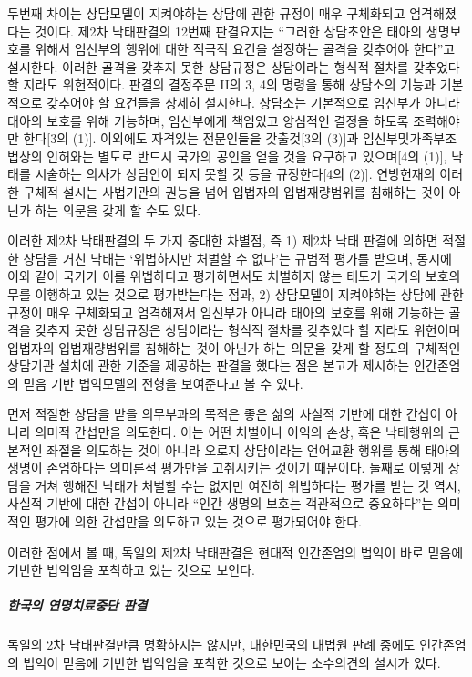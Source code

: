 두번째 차이는 상담모델이 지켜야하는 상담에 관한 규정이 매우 구체화되고 엄격해졌다는 것이다. 제2차 낙태판결의 12번째 판결요지는 ``그러한 상담초안은 태아의 생명보호를 위해서 임신부의 행위에 대한 적극적 요건을 설정하는 골격을 갖추어야 한다''고 설시한다. 이러한 골격을 갖추지 못한 상담규정은 상담이라는 형식적 절차를 갖추었다 할 지라도 위헌적이다. 판결의 결정주문 II의 3, 4의 명령을 통해 상담소의 기능과 기본적으로 갖추어야 할 요건들을 상세히 설시한다. 상담소는 기본적으로 임신부가 아니라 태아의 보호를 위해 기능하며, 임신부에게 책임있고 양심적인 결정을 하도록 조력해야만 한다{[}3의 (1){]}. 이외에도 자격있는 전문인들을 갖출것{[}3의 (3){]}과 임신부및가족부조법상의 인허와는 별도로 반드시 국가의 공인을 얻을 것을 요구하고 있으며{[}4의 (1){]}, 낙태를 시술하는 의사가 상담인이 되지 못할 것 등을 규정한다{[}4의 (2){]}. 연방헌재의 이러한 구체적 설시는 사법기관의 권능을 넘어 입법자의 입법재량범위를 침해하는 것이 아닌가 하는 의문을 갖게 할 수도 있다.

이러한 제2차 낙태판결의 두 가지 중대한 차별점, 즉 1) 제2차 낙태 판결에 의하면 적절한 상담을 거친 낙태는 `위법하지만 처벌할 수 없다'는 규범적 평가를 받으며, 동시에 이와 같이 국가가 이를 위법하다고 평가하면서도 처벌하지 않는 태도가 국가의 보호의무를 이행하고 있는 것으로 평가받는다는 점과, 2) 상담모델이 지켜야하는 상담에 관한 규정이 매우 구체화되고 엄격해져서 임신부가 아니라 태아의 보호를 위해 기능하는 골격을 갖추지 못한 상담규정은 상담이라는 형식적 절차를 갖추었다 할 지라도 위헌이며 입법자의 입법재량범위를 침해하는 것이 아닌가 하는 의문을 갖게 할 정도의 구체적인 상담기관 설치에 관한 기준을 제공하는 판결을 했다는 점은 본고가 제시하는 인간존엄의 믿음 기반 법익모델의 전형을 보여준다고 볼 수 있다.

먼저 적절한 상담을 받을 의무부과의 목적은 좋은 삶의 사실적 기반에 대한 간섭이 아니라 의미적 간섭만을 의도한다. 이는 어떤 처벌이나 이익의 손상, 혹은 낙태행위의 근본적인 좌절을 의도하는 것이 아니라 오로지 상담이라는 언어교환 행위를 통해 태아의 생명이 존엄하다는 의미론적 평가만을 고취시키는 것이기 때문이다. 둘째로 이렇게 상담을 거쳐 행해진 낙태가 처벌할 수는 없지만 여전히 위법하다는 평가를 받는 것 역시, 사실적 기반에 대한 간섭이 아니라 ``인간 생명의 보호는 객관적으로 중요하다''는 의미적인 평가에 의한 간섭만을 의도하고 있는 것으로 평가되어야 한다.

이러한 점에서 볼 때, 독일의 제2차 낙태판결은 현대적 인간존엄의 법익이 바로 믿음에 기반한 법익임을 포착하고 있는 것으로 보인다.

\subparagraph{한국의 연명치료중단 판결}

독일의 2차 낙태판결만큼 명확하지는 않지만, 대한민국의 대법원 판례 중에도 인간존엄의 법익이 믿음에 기반한 법익임을 포착한 것으로 보이는 소수의견의 설시가 있다.

